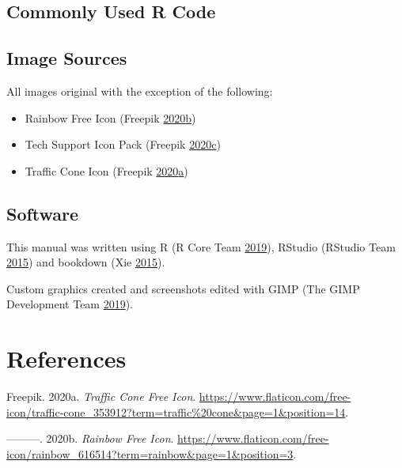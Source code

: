 \documentclass[]{book}
\providecommand{\tightlist}{%
  \setlength{\itemsep}{0pt}\setlength{\parskip}{0pt}}
\begin{document}
\hypertarget{commoncode}{\subsection*{Commonly Used R
Code}\label{commoncode}}

\subsection{Image Sources}\label{image-sources}

All images original with the exception of the following:

\begin{itemize}
\tightlist
\item
  Rainbow Free Icon (Freepik
  \protect\hyperlink{ref-rainbow}{2020}\protect\hyperlink{ref-rainbow}{b})
\item
  Tech Support Icon Pack (Freepik
  \protect\hyperlink{ref-techpack}{2020}\protect\hyperlink{ref-techpack}{c})
\item
  Traffic Cone Icon (Freepik
  \protect\hyperlink{ref-cone}{2020}\protect\hyperlink{ref-cone}{a})
\end{itemize}

\subsection*{Software}\label{software}

This manual was written using R (R Core Team
\protect\hyperlink{ref-baser}{2019}), RStudio (RStudio Team
\protect\hyperlink{ref-rstudio}{2015}) and bookdown (Xie
\protect\hyperlink{ref-xie2015}{2015}).

Custom graphics created and screenshots edited with GIMP (The GIMP
Development Team \protect\hyperlink{ref-gimp}{2019}).

\section*{References}\label{references}

\hypertarget{refs}{}
\hypertarget{ref-cone}{}
Freepik. 2020a. \emph{Traffic Cone Free Icon}.
\url{https://www.flaticon.com/free-icon/traffic-cone_353912?term=traffic\%20cone\&page=1\&position=14}.

\hypertarget{ref-rainbow}{}
---------. 2020b. \emph{Rainbow Free Icon}.
\url{https://www.flaticon.com/free-icon/rainbow_616514?term=rainbow\&page=1\&position=3}.
\end{document}
